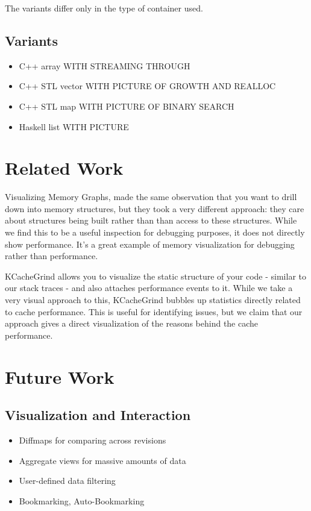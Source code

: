 \documentclass[annual]{acmsiggraph}
\begin{document}
    The variants differ only in the type of container used.

  \subsection{Variants}
    \begin{itemize}
      \item C++ array WITH STREAMING THROUGH
      \item C++ STL vector WITH PICTURE OF GROWTH AND REALLOC
      \item C++ STL map WITH PICTURE OF BINARY SEARCH
      \item Haskell list WITH PICTURE
    \end{itemize}

\section{Related Work}

Visualizing Memory Graphs\cite{zimmerman:2001:VMG}, made the same observation that you want to drill down into memory structures, but they took a very different approach: they care about structures being built rather than than access to these structures. While we find this to be a useful inspection for debugging purposes, it does not directly show performance. It's a great example of memory visualization for debugging rather than performance.

KCacheGrind allows you to visualize the static structure of your code - similar to our stack traces - and also attaches performance events to it. While we take a very visual approach to this, KCacheGrind bubbles up statistics directly related to cache performance. This is useful for identifying issues, but we claim that our approach gives a direct visualization of the reasons behind the cache performance.

\section{Future Work}
  \subsection{Visualization and Interaction}
  \begin{itemize}
    \item Diffmaps for comparing across revisions
    \item Aggregate views for massive amounts of data
    \item User-defined data filtering
    \item Bookmarking, Auto-Bookmarking
  \end{itemize}
\end{document}
